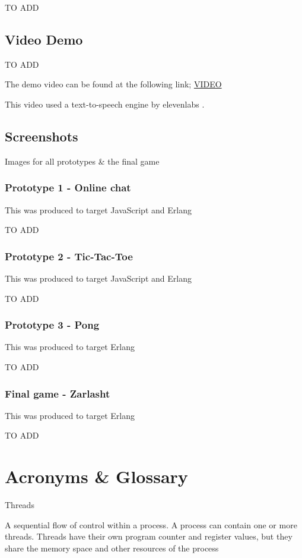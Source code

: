 \documentclass[]{final}
\begin{document}
TO ADD

\section{Video Demo}
TO ADD

The demo video can be found at the following link; \href{}{VIDEO}

This video used a text-to-speech engine by elevenlabs \cite{noauthor_ai_nodate}.

\section{Screenshots}
Images for all prototypes \& the final game
\subsection{Prototype 1 - Online chat}
This was produced to target JavaScript and Erlang%

TO ADD
\subsection{Prototype 2 - Tic-Tac-Toe}
This was produced to target JavaScript and Erlang%

TO ADD
\subsection{Prototype 3 - Pong}
This was produced to target Erlang%

TO ADD
\subsection{Final game - Zarlasht}
This was produced to target Erlang%

TO ADD
\chapter{Acronyms \& Glossary}
Threads

A sequential flow of control within a process. A process can contain one or more threads.
Threads have their own program counter and register values, but they share the memory space
and other resources of the process
\end{document}
